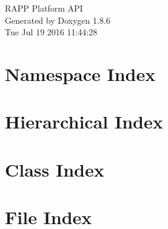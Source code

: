\documentclass[twoside]{book}
\newcommand{\clearemptydoublepage}{%
  \newpage{\pagestyle{empty}\cleardoublepage}%
}
\begin{document}
\hypersetup{pageanchor=false}
\begin{titlepage}
\vspace*{7cm}
\begin{center}%
{\Large R\-A\-P\-P Platform A\-P\-I }\\
\vspace*{1cm}
{\large Generated by Doxygen 1.8.6}\\
\vspace*{0.5cm}
{\small Tue Jul 19 2016 11:44:28}\\
\end{center}
\end{titlepage}
\clearemptydoublepage
\tableofcontents
\clearemptydoublepage
{}
\hypersetup{pageanchor=true}

\chapter{Namespace Index}

\chapter{Hierarchical Index}

\chapter{Class Index}

\chapter{File Index}

\end{document}
